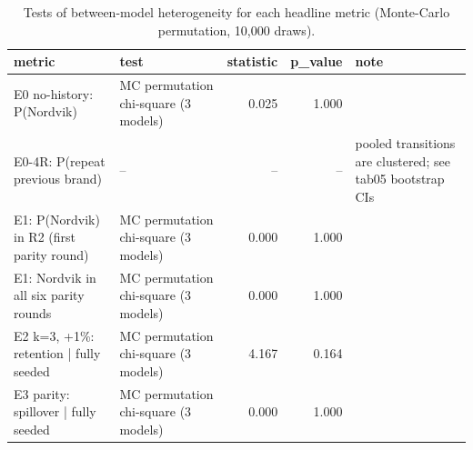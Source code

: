\begin{table}[htbp]
\centering
\scriptsize
\caption{Tests of between-model heterogeneity for each headline metric (Monte-Carlo permutation, 10,000 draws).}
\label{tab:tab17_cross_model_heterogeneity}
\begin{tabular}{llrrl}
\toprule
metric & test & statistic & p\_value & note \\
\midrule
E0 no-history: P(Nordvik) & MC permutation chi-square (3 models) & 0.025 & 1.000 &  \\
E0-4R: P(repeat previous brand) & -- & -- & -- & pooled transitions are clustered; see tab05 bootstrap CIs \\
E1: P(Nordvik) in R2 (first parity round) & MC permutation chi-square (3 models) & 0.000 & 1.000 &  \\
E1: Nordvik in all six parity rounds & MC permutation chi-square (3 models) & 0.000 & 1.000 &  \\
E2 k=3, +1\%: retention | fully seeded & MC permutation chi-square (3 models) & 4.167 & 0.164 &  \\
E3 parity: spillover | fully seeded & MC permutation chi-square (3 models) & 0.000 & 1.000 &  \\
\bottomrule
\end{tabular}
\end{table}